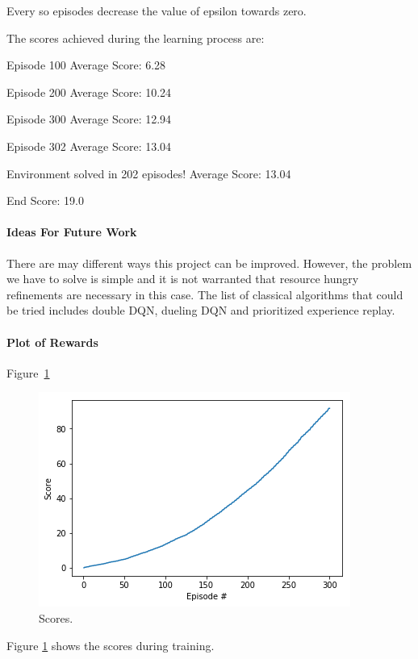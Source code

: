 \documentclass[11pt]{amsart}
\begin{document}
Every so episodes decrease the value of epsilon towards zero.

The scores achieved during the learning process are:

Episode 100	Average Score: 6.28

Episode 200	Average Score: 10.24

Episode 300	Average Score: 12.94

Episode 302	Average Score: 13.04

Environment solved in 202 episodes!	    Average Score: 13.04

End Score: 19.0




\paragraph{\textbf{ Ideas For Future Work}}
    There are may different ways this project can be improved. However, the problem we have to solve is simple and it is not warranted that
    resource hungry refinements are necessary in this case.
     The list of classical algorithms that could be tried includes double DQN, dueling DQN and prioritized experience replay.


\paragraph{\textbf{Plot of Rewards}}
Figure~\ref{fig:scores}
\begin{figure}[h!]
  \includegraphics[width=\linewidth]{scores.png}
  \caption{Scores.}
  \label{fig:scores}
\end{figure}

Figure \ref{fig:scores} shows the scores during training.
\end{document}
